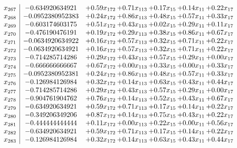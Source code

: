 \documentclass[8pt]{article}
\begin{document}
\[\begin{array}{c| c c@{\hskip 2pt} c@{\hskip 2pt} c@{\hskip 2pt} c@{\hskip 2pt} c@{\hskip 2pt} }
 x_{267}   &  -0.634920634921 & +  0.59 x_{172} & +  0.71 x_{113} & +  0.17 x_{15} & +  0.14 x_{11} & +  0.22 x_{17}\\
 x_{268}   &  -0.0952380952383 & +  0.24 x_{172} & +  0.86 x_{113} & +  0.48 x_{15} & +  0.57 x_{11} & +  0.33 x_{17}\\
 x_{269}   &  -0.603174603175 & +  0.51 x_{172} & +  0.43 x_{113} & +  0.02 x_{15} & +  0.29 x_{11} & +  0.11 x_{17}\\
 x_{270}   &  -0.476190476191 & +  0.19 x_{172} & +  0.29 x_{113} & +  0.38 x_{15} & +  0.86 x_{11} & +  0.67 x_{17}\\
 x_{271}   &  -0.0634920634922 & +  0.16 x_{172} & +  0.57 x_{113} & +  0.32 x_{15} & +  0.71 x_{11} & +  0.22 x_{17}\\
 x_{272}   &  -0.0634920634921 & +  0.16 x_{172} & +  0.57 x_{113} & +  0.32 x_{15} & +  0.71 x_{11} & +  0.22 x_{17}\\
 x_{273}   &  -0.714285714286 & +  0.29 x_{172} & +  0.43 x_{113} & +  0.57 x_{15} & +  0.29 x_{11} & +  0.00 x_{17}\\
 x_{274}   &  -0.666666666667 & +  0.67 x_{172} & +  0.00 x_{113} & +  0.33 x_{15} & +  0.00 x_{11} & +  0.33 x_{17}\\
 x_{275}   &  -0.0952380952381 & +  0.24 x_{172} & +  0.86 x_{113} & +  0.48 x_{15} & +  0.57 x_{11} & +  0.33 x_{17}\\
 x_{276}   &  -0.126984126984 & +  0.32 x_{172} & +  0.14 x_{113} & +  0.63 x_{15} & +  0.43 x_{11} & +  0.44 x_{17}\\
 x_{277}   &  -0.714285714286 & +  0.29 x_{172} & +  0.43 x_{113} & +  0.57 x_{15} & +  0.29 x_{11} & +  0.00 x_{17}\\
 x_{278}   &  -0.904761904762 & +  0.76 x_{172} & +  0.14 x_{113} & +  0.52 x_{15} & +  0.43 x_{11} & +  0.67 x_{17}\\
 x_{279}   &  -0.634920634921 & +  0.59 x_{172} & +  0.71 x_{113} & +  0.17 x_{15} & +  0.14 x_{11} & +  0.22 x_{17}\\
 x_{280}   &  -0.349206349206 & +  0.87 x_{172} & +  0.14 x_{113} & +  0.75 x_{15} & +  0.43 x_{11} & +  0.22 x_{17}\\
 x_{281}   &  -0.444444444444 & +  0.11 x_{172} & +  0.00 x_{113} & +  0.22 x_{15} & +  0.00 x_{11} & +  0.56 x_{17}\\
 x_{282}   &  -0.634920634921 & +  0.59 x_{172} & +  0.71 x_{113} & +  0.17 x_{15} & +  0.14 x_{11} & +  0.22 x_{17}\\
 x_{283}   &  -0.126984126984 & +  0.32 x_{172} & +  0.14 x_{113} & +  0.63 x_{15} & +  0.43 x_{11} & +  0.44 x_{17}\\

\end{array}\]
\end{document}
